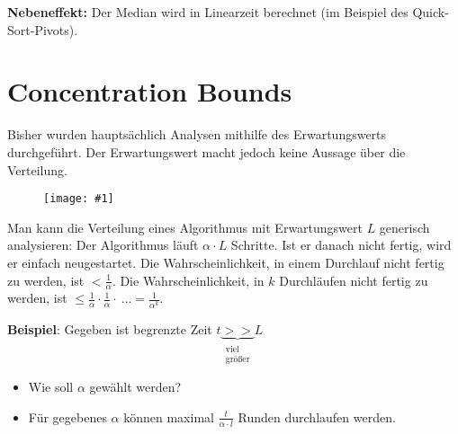 \documentclass{scrartcl}%
\newcommand{\includepic}[2]{\texttt{[image: \#1]}}
\begin{document}
    \textbf{\textsf{Nebeneffekt:}} Der Median wird in Linearzeit berechnet (im Beispiel des Quick-Sort-Pivots).

    \section*{Concentration Bounds}\label{sec:concentrationBounds}
    Bisher wurden hauptsächlich Analysen mithilfe des Erwartungswerts durchgeführt.
    Der Erwartungswert macht jedoch keine Aussage über die Verteilung.

    \begin{figure}[htb]
        \centering
        \includepic{lec_05_b}{0.5}
    \end{figure}

    Man kann die Verteilung eines Algorithmus mit Erwartungswert $L$ generisch analysieren: Der Algorithmus läuft $\alpha \cdot L$ Schritte.
    Ist er danach nicht fertig, wird er einfach neugestartet.
    Die Wahrscheinlichkeit, in einem Durchlauf nicht fertig zu werden, ist $<\frac{1}{\alpha}$.
    Die Wahrscheinlichkeit, in $k$ Durchläufen nicht fertig zu werden, ist $\leq \frac{1}{\alpha} \cdot \frac{1}{\alpha} \cdot\ ... = \frac{1}{\alpha^k}$.

    \vspace{0.3cm}
    \textsf{\textbf{Beispiel}}: Gegeben ist begrenzte Zeit $t \underbrace{>>}_{\substack{\text{viel} \\ \text{größer}}} L$
    \begin{itemize}
        \item Wie soll $\alpha$ gewählt werden?
        \item Für gegebenes $\alpha$ können maximal $\frac{t}{\alpha \cdot l}$ Runden durchlaufen werden.
    \end{itemize}
\end{document}
